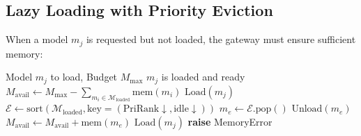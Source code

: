 \documentclass[11pt,a4paper,twocolumn]{article}
\begin{document}
\begin{table}[h]
\centering
\caption{Model registry with memory and scheduling parameters.}
\label{tab:models}
{\scriptsize
\setlength{\tabcolsep}{4pt}
}
\end{table}

\subsection{Lazy Loading with Priority Eviction}

When a model $m_j$ is requested but not loaded, the gateway must ensure sufficient memory:

\begin{algorithm}[h]
\caption{Memory-Aware Model Loading}
\label{alg:memory}
\footnotesize
\begin{algorithmic}[1]
\REQUIRE Model $m_j$ to load, Budget $M_\text{max}$
\ENSURE $m_j$ is loaded and ready
\STATE $M_\text{avail} \leftarrow M_\text{max} - \sum_{m_i \in \mathcal{M}_\text{loaded}} \text{mem}(m_i)$
    \STATE $\text{Load}(m_j)$ 
\ELSE
    \STATE {}
  \STATE $\mathcal{E} \leftarrow \text{sort}(\mathcal{M}_\text{loaded}, \text{key}=(\text{PriRank} \downarrow, \text{idle} \downarrow))$
        \STATE $m_e \leftarrow \mathcal{E}.\text{pop}()$
            \STATE $\text{Unload}(m_e)$
            \STATE $M_\text{avail} \leftarrow M_\text{avail} + \text{mem}(m_e)$
        \ENDIF
    \ENDWHILE
        \STATE $\text{Load}(m_j)$
    \ELSE
        \STATE \textbf{raise} MemoryError
    \ENDIF
\ENDIF
\end{algorithmic}
\end{algorithm}
\end{document}
